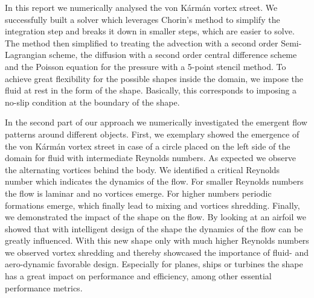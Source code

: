 In this report we numerically analysed the von Kármán vortex street. We successfully built a solver which leverages Chorin's method to simplify the integration step and breaks it down in smaller steps, which are easier to solve. The method then simplified to treating the advection with a second order Semi-Lagrangian scheme, the diffusion with a second order central difference scheme and the Poisson equation for the pressure with a 5-point stencil method. To achieve great flexibility for the possible shapes inside the domain, we impose the fluid at rest in the form of the shape. Basically, this corresponds to imposing a no-slip condition at the boundary of the shape.

In the second part of our approach we numerically investigated the emergent flow patterns around different objects. First, we exemplary showed the emergence of the von Kármán vortex street in case of a circle placed on the left side of the domain for fluid with intermediate Reynolds numbers. As expected we observe the alternating vortices behind the body. We identified a critical Reynolds number which indicates the dynamics of the flow. For smaller Reynolds numbers the flow is laminar and no vortices emerge. For higher numbers periodic formations emerge, which finally lead to mixing and vortices shredding. Finally, we demonstrated the impact of the shape on the flow. By looking at an airfoil we showed that with intelligent design of the shape the dynamics of the flow can be greatly influenced. With this new shape only with much higher Reynolds numbers we observed vortex shredding and thereby showcased the importance of fluid- and aero-dynamic favorable design. Especially for planes, ships or turbines the shape has a great impact on performance and efficiency, among other essential performance metrics.
